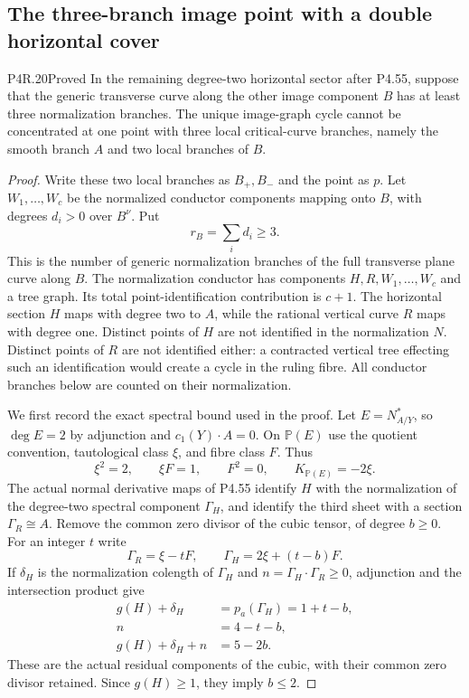 \subsection{The three-branch image point with a double horizontal cover}

\begin{statement}{P4R.20}{Proved}
In the remaining degree-two horizontal sector after P4.55,
suppose that the generic transverse curve along the other
image component $B$ has at least three normalization branches.
The unique image-graph cycle cannot be concentrated at one
point with three local critical-curve branches, namely the
smooth branch $A$ and two local branches of $B$.
\end{statement}
\begin{proof}
Write these two local branches as $B_+,B_-$ and the
point as $p$. Let $W_1,\ldots,W_c$ be the normalized
conductor components mapping onto $B$, with degrees
$d_i>0$ over $B^\nu$. Put
\[
                         r_B=\sum_i d_i\ge3.
\]
This is the number of generic normalization branches
of the full transverse plane curve along $B$.
The normalization conductor has components
$H,R,W_1,\ldots,W_c$ and a tree graph. Its total
point-identification contribution is $c+1$.
The horizontal section $H$ maps with degree two to
$A$, while the rational vertical curve $R$ maps
with degree one. Distinct points of $H$ are not
identified in the normalization $N$. Distinct
points of $R$ are not identified either: a
contracted vertical tree effecting such an
identification would create a cycle in the ruling
fibre. All conductor branches below are counted
on their normalization.

We first record the exact spectral bound used in
the proof. Let $E=N_{A/Y}^*$, so $\deg E=2$ by
adjunction and $c_1(Y)\cdot A=0$. On $\mathbb P(E)$
use the quotient convention, tautological class
$\xi$, and fibre class $F$. Thus
\[
          \xi^2=2,\qquad \xi F=1,\qquad F^2=0,
          \qquad K_{\mathbb P(E)}=-2\xi.
\]
The actual normal derivative maps of P4.55 identify
$H$ with the normalization of the degree-two
spectral component $\Gamma_H$, and identify the
third sheet with a section $\Gamma_R\cong A$.
Remove the common zero divisor of the cubic tensor,
of degree $b\ge0$. For an integer $t$ write
\[
       \Gamma_R=\xi-tF,\qquad
       \Gamma_H=2\xi+(t-b)F.
\]
If $\delta_H$ is the normalization colength of
$\Gamma_H$ and $n=\Gamma_H\cdot\Gamma_R\ge0$,
adjunction and the intersection product give
\[
 \begin{split}
       g(H)+\delta_H&=p_a(\Gamma_H)=1+t-b,\\
       n&=4-t-b,\\
       g(H)+\delta_H+n&=5-2b.
 \end{split}                                                   \tag{R20.1}
\]
These are the actual residual components of the
cubic, with their common zero divisor retained.
Since $g(H)\ge1$, they imply $b\le2$.


\end{proof}
